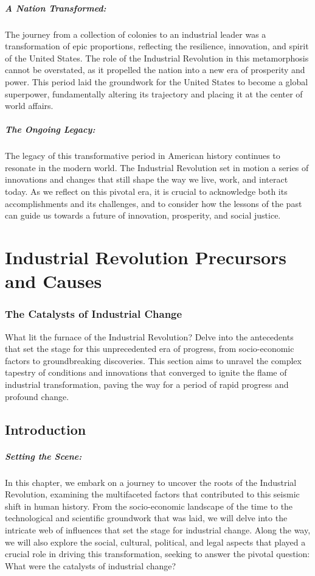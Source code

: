 \documentclass[a4paper,12pt]{book}
\begin{document}
\paragraph{A Nation Transformed:}
The journey from a collection of colonies to an industrial leader was a transformation of epic proportions, reflecting the resilience, innovation, and spirit of the United States. The role of the Industrial Revolution in this metamorphosis cannot be overstated, as it propelled the nation into a new era of prosperity and power. This period laid the groundwork for the United States to become a global superpower, fundamentally altering its trajectory and placing it at the center of world affairs.

\paragraph{The Ongoing Legacy:}
The legacy of this transformative period in American history continues to resonate in the modern world. The Industrial Revolution set in motion a series of innovations and changes that still shape the way we live, work, and interact today. As we reflect on this pivotal era, it is crucial to acknowledge both its accomplishments and its challenges, and to consider how the lessons of the past can guide us towards a future of innovation, prosperity, and social justice.

\chapter{Industrial Revolution Precursors and Causes}
\subsection*{The Catalysts of Industrial Change}
What lit the furnace of the Industrial Revolution? Delve into the antecedents that set the stage for this unprecedented era of progress, from socio-economic factors to groundbreaking discoveries. This section aims to unravel the complex tapestry of conditions and innovations that converged to ignite the flame of industrial transformation, paving the way for a period of rapid progress and profound change.

\section*{Introduction}

\paragraph{Setting the Scene:}
In this chapter, we embark on a journey to uncover the roots of the Industrial Revolution, examining the multifaceted factors that contributed to this seismic shift in human history. From the socio-economic landscape of the time to the technological and scientific groundwork that was laid, we will delve into the intricate web of influences that set the stage for industrial change. Along the way, we will also explore the social, cultural, political, and legal aspects that played a crucial role in driving this transformation, seeking to answer the pivotal question: What were the catalysts of industrial change?
\end{document}
